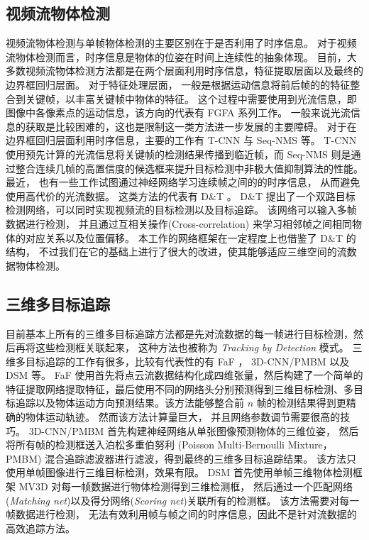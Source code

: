 \subsection{视频流物体检测}
\label{video_detect}
视频流物体检测与单帧物体检测的主要区别在于是否利用了时序信息。 对于视频流物体检测而言，时序信息是物体的位姿在时间上连续性的抽象体现。 目前，大多数视频流物体检测方法都是在两个层面利用时序信息，特征提取层面以及最终的边界框回归层面。 对于特征处理层面， 一般是根据运动信息将前后帧的的特征整合到关键帧，以丰富关键帧中物体的特征。 这个过程中需要使用到光流信息，即图像中各像素点的运动信息，该方向的代表有 FGFA \cite{zhu2017flow}系列工作。 一般来说光流信息的获取是比较困难的，这也是限制这一类方法进一步发展的主要障碍。 对于在边界框回归层面利用时序信息，主要的工作有 T-CNN \cite{kang2018t, kang2016object} 与 Seq-NMS \cite{han2016seq}等。 T-CNN 使用预先计算的光流信息将关键帧的检测结果传播到临近帧，而 Seq-NMS 则是通过整合连续几帧的高置信度的候选框来提升目标检测中非极大值抑制算法的性能。 最近， 也有一些工作试图通过神经网络学习连续帧之间的的时序信息， 从而避免使用高代价的光流数据。 这类方法的代表有 D\&T \cite{feichtenhofer2017detect}。 D\&T 提出了一个双路目标检测网络，可以同时实现视频流的目标检测以及目标追踪。 该网络可以输入多帧数据进行检测， 并且通过互相关操作(Cross-correlation) 来学习相邻帧之间相同物体的对应关系以及位置偏移。 本工作的网络框架在一定程度上也借鉴了 D\&T 的结构， 不过我们在它的基础上进行了很大的改进，使其能够适应三维空间的流数据物体检测。

\subsection{三维多目标追踪}
\label{tracking}
目前基本上所有的三维多目标追踪方法都是先对流数据的每一帧进行目标检测，然后再将这些检测框关联起来， 这种方法也被称为 \textit{Tracking by Detection} \cite{lenz2015followme}模式。 三维多目标追踪的工作有很多，比较有代表性的有 FaF \cite{luo2018fast}， 3D-CNN/PMBM \cite{scheidegger2018mono}以及 DSM \cite{frossard2018end}等。 FaF 使用首先将点云流数据结构化成四维张量，然后构建了一个简单的特征提取网络提取特征，最后使用不同的网络头分别预测得到三维目标检测、多目标追踪以及物体运动方向预测结果。该方法能够整合前 $n$ 帧的检测结果得到更精确的物体运动轨迹。 然而该方法计算量巨大， 并且网络参数调节需要很高的技巧。  3D-CNN/PMBM 首先构建神经网络从单张图像预测物体的三维位姿， 然后将所有帧的检测框送入泊松多重伯努利 (Poisson Multi-Bernoulli Mixture， PMBM) 混合追踪滤波器进行滤波，得到最终的三维多目标追踪结果。 该方法只使用单帧图像进行三维目标检测，效果有限。 DSM 首先使用单帧三维物体检测框架 MV3D \cite{chen2017multi} 对每一帧数据进行物体检测得到三维检测框， 然后通过一个匹配网络(\textit{Matching net})以及得分网络(\textit{Scoring net})关联所有的检测框。 该方法需要对每一帧数据进行检测， 无法有效利用帧与帧之间的时序信息，因此不是针对流数据的高效追踪方法。

